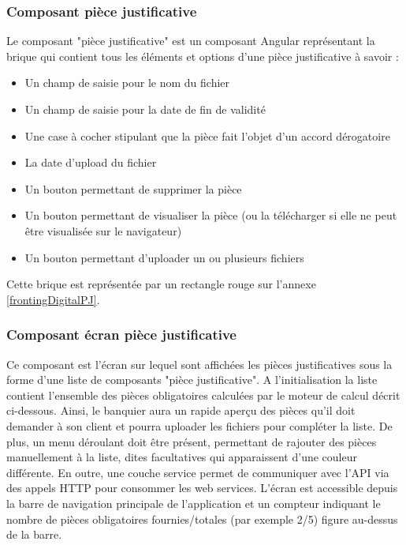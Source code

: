 	\subsubsection{Composant pièce justificative}
	Le composant "pièce justificative" est un composant Angular représentant la brique qui contient tous les éléments et options d'une pièce justificative à savoir :
	\begin{itemize}
		\item Un champ de saisie pour le nom du fichier
		\item Un champ de saisie pour la date de fin de validité
		\item Une case à cocher stipulant que la pièce fait l'objet d'un accord dérogatoire
		\item La date d'upload du fichier
		\item Un bouton permettant de supprimer la pièce
		\item Un bouton permettant de visualiser la pièce (ou la télécharger si elle ne peut être visualisée sur le navigateur)
		\item Un bouton permettant d'uploader un ou plusieurs fichiers
	\end{itemize}
	Cette brique est représentée par un rectangle rouge sur l'annexe \ref{frontingDigitalPJ}.
	
	\subsubsection{Composant écran pièce justificative}
	Ce composant est l'écran sur lequel sont affichées les pièces justificatives sous la forme d'une liste de composants "pièce justificative". A l'initialisation la liste contient l'ensemble des pièces obligatoires calculées par le moteur de calcul décrit ci-dessous. Ainsi, le banquier aura un rapide aperçu des pièces qu'il doit demander à son client et pourra uploader les fichiers pour compléter la liste. De plus, un menu déroulant doit être présent, permettant de rajouter des pièces manuellement à la liste, dites facultatives qui apparaissent d'une couleur différente. En outre, une couche service permet de communiquer avec l'API via des appels HTTP pour consommer les web services. L'écran est accessible depuis la barre de navigation principale de l'application et un compteur indiquant le nombre de pièces obligatoires fournies/totales (par exemple 2/5) figure au-dessus de la barre.
	
